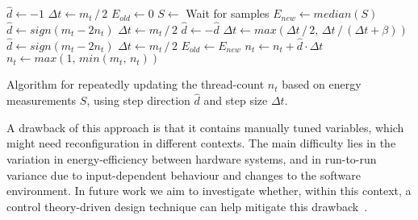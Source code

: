 \begin{algorithm}[!ht]
    \begin{algorithmic}[1]
            \State $\hat{d} \gets -1$
            \State $\Delta t \gets m_t\, /\, 2$
            \State $E_{old} \gets 0$
            \Loop
                \State $S \gets$ Wait for samples
                \State $E_{new} \gets median(S)$
                    \State $\hat{d} \gets sign(m_t - 2 n_t)$
                    \State $\Delta t \gets m_t\, /\, 2$
                \Else
                        \State $\hat{d} \gets -\hat{d}$
                    \EndIf
                        \State $\Delta t \gets max(\Delta t\, /\, 2,\, \Delta t\, /\, (\Delta t + \beta))$
                    \Else
                        \State $\hat{d} \gets sign(m_t - 2 n_t)$
                        \State $\Delta t \gets m_t\, /\, 2$
                    \EndIf
                \EndIf
                \State $E_{old} \gets E_{new}$
                \State $n_t \gets n_t + \hat{d} \cdot \Delta t$
                \State $n_t \gets max(1,\, min(m_t,\, n_t))$
            \EndLoop
    \end{algorithmic}%
    \caption{Algorithm for repeatedly updating the thread-count $n_t$ based on energy measurements
    $S$, using step direction $\hat{d}$ and step size $\Delta t$.}
    \label{alg:controller}
\end{algorithm}

A drawback of this approach is that it contains manually tuned variables, which might need
reconfiguration in different contexts. The main difficulty lies in the variation in
energy-efficiency between hardware systems, and in run-to-run variance due to input-dependent
behaviour and changes to the software environment. In future work we aim to investigate whether,
within this context, a control theory-driven design technique can help mitigate this
drawback~\cite{control-theory}.
